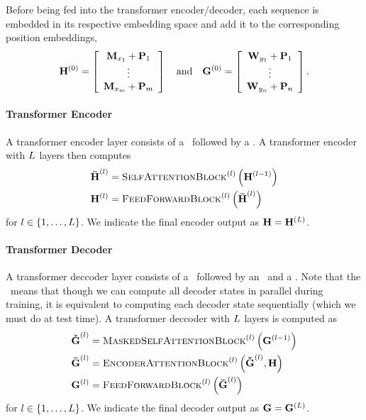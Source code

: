 Before being fed into the transformer encoder/decoder, each sequence is 
embedded in its respective embedding space and add it to the corresponding
position embeddings,
\[\mathbf{H}^{(0)} = \left[ \begin{array}{c}\mathbf{M}_{x_1} + \mathbf{P}_1\\
\vdots \\ \mathbf{M}_{x_{m}} + \mathbf{P}_{m} \end{array}\right] 
\quad \textrm{and} \quad 
\mathbf{G}^{(0)} = \left[ \begin{array}{c}\mathbf{W}_{y_1} + \mathbf{P}_1\\
\vdots \\ \mathbf{W}_{y_n} + \mathbf{P}_n \end{array}\right].
\]

  \paragraph{Transformer Encoder}
    A transformer encoder layer consists of a \selfattentionblock~followed
    by a \feedforwardblock. A transformer encoder with $L$ layers
    then computes
\begin{align*} 
    {\boldsymbol{\bar{\mathbf{H}}}^{(l)}} & = \textsc{SelfAttentionBlock}^{(l)}
\left(\mathbf{H}^{(l-1)}\right) \\
    \mathbf{H}^{(l)} & = \textsc{FeedForwardBlock}^{(l)}\left({\boldsymbol{\bar{\mathbf{H}}}^{(l)}}\right)
\end{align*} for $l \in \{1,\ldots,L\}$.
We indicate the final encoder output as $\mathbf{H} =  \mathbf{H}^{(L)}$.
    
  \paragraph{Transformer Decoder}
    A transformer deccoder layer consists of a \maskedselfattentionblock~followed
    by an \encoderattentionblock~and a \feedforwardblock. Note that the \maskedselfattentionblock~means that though we can compute all decoder states
    in parallel during training, it is equivalent to computing each decoder state sequentially (which we must do at test time). 
    A transformer deccoder with $L$ layers
    is computed as
\begin{align*} 
    {\boldsymbol{\check{\mathbf{G}}}}^{(l)} & = \textsc{MaskedSelfAttentionBlock}^{(l)}\left(\mathbf{G}^{(l-1)}\right) \\
    {\boldsymbol{\bar{\mathbf{G}}}}^{(l)} & = \textsc{EncoderAttentionBlock}^{(l)}\left(\boldsymbol{\check{\mathbf{G}}}^{(l)}, \mathbf{H}\right) \\
    \mathbf{G}^{(l)} & = \textsc{FeedForwardBlock}^{(l)}\left({\boldsymbol{\bar{\mathbf{G}}}^{(l)}}\right)
\end{align*} for $l \in \{1,\ldots,L\}$.
We indicate the final decoder output as $\mathbf{G} =  \mathbf{G}^{(L)}$.

